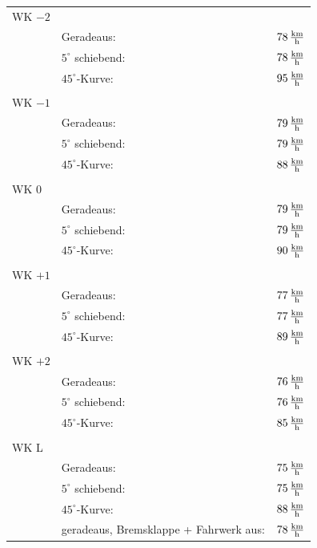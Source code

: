 \begin{tabular}{l l l}
WK $-2$ & & \\
& Geradeaus: & $\unit[78]{\frac{km}{h}}$\\
& $5^{\circ}$ schiebend: & $\unit[78]{\frac{km}{h}}$\\
& $45^{\circ}$-Kurve: & $\unit[95]{\frac{km}{h}}$\\
\hline
& &  \\
WK $-1$ & & \\
& Geradeaus: & $\unit[79]{\frac{km}{h}}$\\
& $5^{\circ}$ schiebend: & $\unit[79]{\frac{km}{h}}$\\
& $45^{\circ}$-Kurve: & $\unit[88]{\frac{km}{h}}$\\
\hline
& &  \\
WK $0$ & & \\
& Geradeaus: & $\unit[79]{\frac{km}{h}}$\\
& $5^{\circ}$ schiebend: & $\unit[79]{\frac{km}{h}}$\\
& $45^{\circ}$-Kurve: & $\unit[90]{\frac{km}{h}}$\\
\hline
& &  \\
WK $+1$ & & \\
& Geradeaus: & $\unit[77]{\frac{km}{h}}$\\
& $5^{\circ}$ schiebend: & $\unit[77]{\frac{km}{h}}$\\
& $45^{\circ}$-Kurve: & $\unit[89]{\frac{km}{h}}$\\
\hline
 & & \\
WK $+2$ & & \\
& Geradeaus: & $\unit[76]{\frac{km}{h}}$\\
& $5^{\circ}$ schiebend: & $\unit[76]{\frac{km}{h}}$\\
& $45^{\circ}$-Kurve: & $\unit[85]{\frac{km}{h}}$\\
\hline
& &  \\
WK L& & \\
& Geradeaus: & $\unit[75]{\frac{km}{h}}$\\
& $5^{\circ}$ schiebend: & $\unit[75]{\frac{km}{h}}$\\
& $45^{\circ}$-Kurve: & $\unit[88]{\frac{km}{h}}$\\
& geradeaus, Bremsklappe + Fahrwerk aus: & $\unit[78]{\frac{km}{h}}$ \\
\end{tabular}
